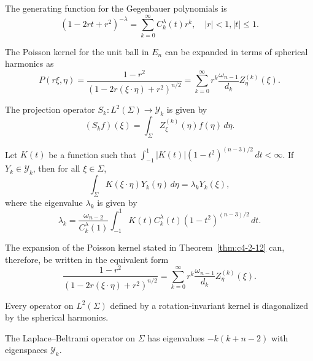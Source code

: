\begin{lemma}\label{lem:c4-2-11}
The generating function for the Gegenbauer polynomials is
\[
(1 - 2rt + r^2)^{-\lambda} = \sum_{k=0}^\infty C_k^\lambda(t) r^k, \quad |r| < 1, |t| \leq 1.
\]
\end{lemma}

\begin{theorem}\label{thm:c4-2-12}
The Poisson kernel for the unit ball in $E_n$ can be expanded in terms of spherical harmonics as
\[
P(r\xi, \eta) = \frac{1 - r^2}{(1 - 2r(\xi \cdot \eta) + r^2)^{n/2}} = \sum_{k=0}^\infty r^k \frac{\omega_{n-1}}{d_k} Z_\eta^{(k)}(\xi).
\]
\end{theorem}

\begin{corollary}\label{cor:c4-2-13}
The projection operator $S_k : L^2(\Sigma) \to \mathcal{Y}_k$ is given by
\[
(S_k f)(\xi) = \int_\Sigma Z_\xi^{(k)}(\eta) f(\eta)\,d\eta.
\]
\end{corollary}

\begin{theorem}\label{thm:c4-2-14}
Let $K(t)$ be a function such that $\int_{-1}^1 |K(t)| (1 - t^2)^{(n-3)/2}\,dt < \infty$. If $Y_k \in \mathcal{Y}_k$, then for all $\xi \in \Sigma$,
\[
\int_\Sigma K(\xi \cdot \eta) Y_k(\eta)\,d\eta = \lambda_k Y_k(\xi),
\]
where the eigenvalue $\lambda_k$ is given by
\[
\lambda_k = \frac{\omega_{n-2}}{C_k^\lambda(1)} \int_{-1}^1 K(t) C_k^\lambda(t) (1 - t^2)^{(n-3)/2}\,dt.
\]
\end{theorem}

The expansion of the Poisson kernel stated in Theorem~\ref{thm:c4-2-12} can, therefore, be written in the equivalent form
\begin{equation}\label{eq:c4-2-15}
\frac{1 - r^2}{(1 - 2r(\xi \cdot \eta) + r^2)^{n/2}} = \sum_{k=0}^\infty r^k \frac{\omega_{n-1}}{d_k} Z_\eta^{(k)}(\xi).
\end{equation}

\begin{corollary}\label{cor:c4-2-16}
Every operator on $L^2(\Sigma)$ defined by a rotation-invariant kernel is diagonalized by the spherical harmonics.
\end{corollary}

\begin{corollary}\label{cor:c4-2-17}
The Laplace--Beltrami operator on $\Sigma$ has eigenvalues $-k(k + n - 2)$ with eigenspaces $\mathcal{Y}_k$.
\end{corollary}

